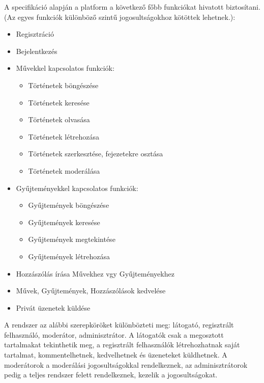 A specifikáció alapján a platform a következő főbb funkciókat hivatott biztosítani. 
(Az egyes funkciók különböző szintű jogosultságokhoz kötöttek lehetnek.):
\begin{itemize}
    \item  Regisztráció
    \item  Bejelentkezés
    \item  Művekkel kapcsolatos funkciók:
    \begin{itemize}
        \item Történetek böngészése
        \item Történetek keresése
        \item Történetek olvasása
        \item Történetek létrehozása
        \item Történetek szerkesztése, fejezetekre osztása
        \item Történetek moderálása

    \end{itemize}
    \item  Gyűjteményekkel kapcsolatos funkciók:
    \begin{itemize}
        \item Gyűjtemények böngészése
        \item Gyűjtemények keresése
        \item Gyűjtemények megtekintése
        \item Gyűjtemények létrehozása 
    \end{itemize}
    \item  Hozzászólás írása Művekhez vgy Gyűjteményekhez
    \item  Művek, Gyűjtemények, Hozzászólások kedvelése
    \item  Privát üzenetek küldése
\end{itemize}

A rendszer az alábbi szerepköröket különbözteti meg: látogató, regisztrált felhasználó, moderátor, adminisztrátor. 
A látogatók csak a megosztott tartalmakat tekinthetik meg, a regisztrált felhasználók létrehozhatnak saját tartalmat, kommentelhetnek, kedvelhetnek és üzeneteket küldhetnek.
A moderátorok a moderálási jogosultságokkal rendelkeznek, az adminisztrátorok pedig a teljes rendszer felett rendelkeznek, kezelik a jogosultságokat.


